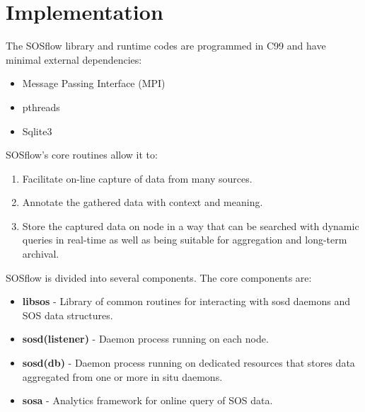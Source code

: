 \section{Implementation}
%
The SOSflow library and runtime codes are programmed in C99 and have
minimal external dependencies:
%
\begin{itemize}
%
\item Message Passing Interface (MPI)
%
\item pthreads
%
\item Sqlite3
%
\end{itemize}
%
SOSflow's core routines allow it to:
%
\begin{enumerate}
    \item Facilitate on-line capture of data from many sources.
    \item Annotate the gathered data with context and meaning.
    \item Store the captured data on node in a way that can be
      searched with dynamic queries in real-time as well as being
      suitable for aggregation and long-term archival.
\end{enumerate}
SOSflow is divided into several components.  The core components are:
%
\begin{itemize}
    \item \textbf{libsos} - Library of common routines for interacting with
      sosd daemons and SOS data structures.
    \item \textbf{sosd(listener)} - Daemon process running on each node.
    \item \textbf{sosd(db)} - Daemon process running on dedicated resources
      that stores data aggregated from one or more in situ daemons.
    \item \textbf{sosa} - Analytics framework for online query of SOS data.
\end{itemize}

